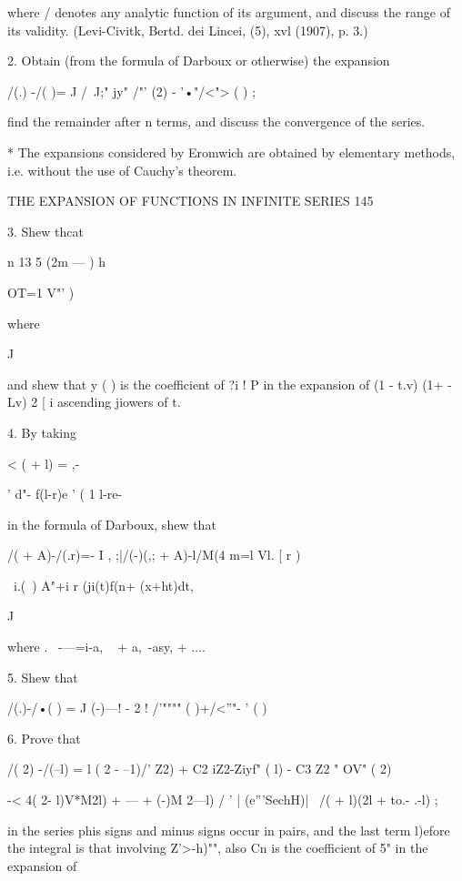 {{where / denotes any analytic function of its argument, and discuss the range of its 
validity. (Levi-Civitk, Bertd. dei Lincei, (5), xvl (1907), p. 3.) 

2. Obtain (from the formula of Darboux or otherwise) the expansion 

/(.) -/( )= J /~J;" jy"  /"' (2) - '•"/<"> ( )  ; 

find the remainder after n terms, and discuss the convergence of the series. 

* The expansions considered by Eromwich are obtained by elementary methods, i.e. without 
the use of Cauchy's theorem. 



THE EXPANSION OF FUNCTIONS IN INFINITE SERIES 145 

3. Shew thcat 

n 13 5 (2m —  )  h  

OT=1 V"'  )   



where 



J 



and shew that y  ( ) is the coefficient of ?i ! P in the expansion of  (1 - t.v) (1+   - Lv)  2 [ i 
ascending jiowers of t. 

4. By taking 



< (  + l) = ,-  



' d"- f(l-r)e ' 
(  1 l-re-  



in the formula of Darboux, shew that 

/(  + A)-/(.r)=- I  ,  ;|/(-)(,; + A)-l/M(4 
m=l Vl. [ r ) 

\ i.(\ ) A"+i r (ji(t)f(n+ (x+ht)dt, 

J 

where . \  -—=i-a, ~ + a,~-asy, + .... 

5. Shew that 

/(.)-/•( ) = J  (-)—! -   2 !  /'"""" ( )+/<''"- ' ( )  

6. Prove that 

/( 2) -/(--l) =  l ( 2 - --1)/'  Z2) + C2 iZ2-Ziyf" ( l) - C3  Z2 "  OV" ( 2) 

-< 4( 2- l)V*M2l) + --- + (-)M 2---l)  / ' | (e'''SechH)| \  /(  + l)(2l + to.- .-l) ; 

in the series phis signs and minus signs occur in pairs, and the last term l)efore the 
integral is that involving  Z'>-h)"", also Cn is the coefficient of 5" in the expansion of 

}}
